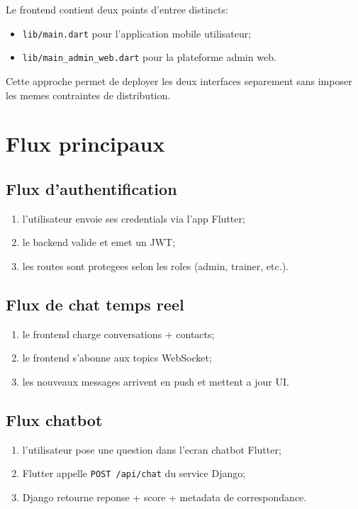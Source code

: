 Le frontend contient deux points d'entree distincts:
\begin{itemize}[leftmargin=*]
  \item \texttt{lib/main.dart} pour l'application mobile utilisateur;
  \item \texttt{lib/main\_admin\_web.dart} pour la plateforme admin web.
\end{itemize}

Cette approche permet de deployer les deux interfaces separement sans imposer les memes contraintes de distribution.

\section{Flux principaux}

\subsection*{Flux d'authentification}
\begin{enumerate}[leftmargin=*]
  \item l'utilisateur envoie ses credentials via l'app Flutter;
  \item le backend valide et emet un JWT;
  \item les routes sont protegees selon les roles (admin, trainer, etc.).
\end{enumerate}

\subsection*{Flux de chat temps reel}
\begin{enumerate}[leftmargin=*]
  \item le frontend charge conversations + contacts;
  \item le frontend s'abonne aux topics WebSocket;
  \item les nouveaux messages arrivent en push et mettent a jour UI.
\end{enumerate}

\subsection*{Flux chatbot}
\begin{enumerate}[leftmargin=*]
  \item l'utilisateur pose une question dans l'ecran chatbot Flutter;
  \item Flutter appelle \texttt{POST /api/chat} du service Django;
  \item Django retourne reponse + score + metadata de correspondance.
\end{enumerate}
